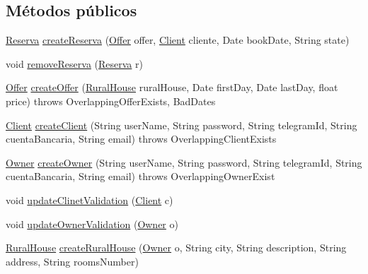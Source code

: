 \subsection*{Métodos públicos}
\begin{DoxyCompactItemize}
\item 
\mbox{\hyperlink{classdomain_1_1_reserva}{Reserva}} \mbox{\hyperlink{classbusiness_logic_1_1_facade_implementation_w_s_a5bbdf1cf4235a84736744f3516ec1dae}{create\+Reserva}} (\mbox{\hyperlink{classdomain_1_1_offer}{Offer}} offer, \mbox{\hyperlink{classdomain_1_1_client}{Client}} cliente, Date book\+Date, String state)
\item 
void \mbox{\hyperlink{classbusiness_logic_1_1_facade_implementation_w_s_ae4cb91caac6aed10801d61b70702fd30}{remove\+Reserva}} (\mbox{\hyperlink{classdomain_1_1_reserva}{Reserva}} r)
\item 
\mbox{\hyperlink{classdomain_1_1_offer}{Offer}} \mbox{\hyperlink{classbusiness_logic_1_1_facade_implementation_w_s_ac7b3bdfd0815ea7c787da312de594cce}{create\+Offer}} (\mbox{\hyperlink{classdomain_1_1_rural_house}{Rural\+House}} rural\+House, Date first\+Day, Date last\+Day, float price)  throws Overlapping\+Offer\+Exists, Bad\+Dates 
\item 
\mbox{\hyperlink{classdomain_1_1_client}{Client}} \mbox{\hyperlink{classbusiness_logic_1_1_facade_implementation_w_s_a2c5f0e41c6463d8e5c7d4b89ea3f676f}{create\+Client}} (String user\+Name, String password, String telegram\+Id, String cuenta\+Bancaria, String email)  throws Overlapping\+Client\+Exists 
\item 
\mbox{\hyperlink{classdomain_1_1_owner}{Owner}} \mbox{\hyperlink{classbusiness_logic_1_1_facade_implementation_w_s_ad7a2f26be66f4ae4cbc2a4ad89e74e53}{create\+Owner}} (String user\+Name, String password, String telegram\+Id, String cuenta\+Bancaria, String email)  throws Overlapping\+Owner\+Exist 
\item 
void \mbox{\hyperlink{classbusiness_logic_1_1_facade_implementation_w_s_aa1ef9c26fc3278ef6c4170094ed6dcaa}{update\+Clinet\+Validation}} (\mbox{\hyperlink{classdomain_1_1_client}{Client}} c)
\item 
void \mbox{\hyperlink{classbusiness_logic_1_1_facade_implementation_w_s_a9c3c6f8a2ec5a4d19defc324fc60c523}{update\+Owner\+Validation}} (\mbox{\hyperlink{classdomain_1_1_owner}{Owner}} o)
\item 
\mbox{\hyperlink{classdomain_1_1_rural_house}{Rural\+House}} \mbox{\hyperlink{classbusiness_logic_1_1_facade_implementation_w_s_a2df596d357c02b4aef6711526347c951}{create\+Rural\+House}} (\mbox{\hyperlink{classdomain_1_1_owner}{Owner}} o, String city, String description, String address, String rooms\+Number)

\end{DoxyCompactItemize}
